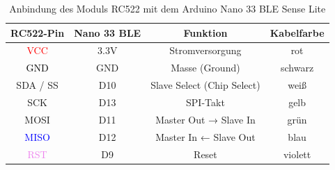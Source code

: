 \begin{table}[H]
	\centering
	\begin{tabular}{|c|c|c|c|}
		\hline
		\textbf{RC522-Pin} & \textbf{Nano 33 BLE} & \textbf{Funktion} & \textbf{Kabelfarbe} \\
		\hline
		\textcolor{red}{VCC} & 3.3V & Stromversorgung & \cellcolor{red!20}rot \\
		\hline
		\textcolor{black}{GND} & GND & Masse (Ground) & \cellcolor{black!10}schwarz \\
		\hline
		\textcolor{white!50!black}{SDA / SS} & D10 & Slave Select (Chip Select) & \cellcolor{gray!10}weiß \\
		\hline
		\textcolor{yellow!70!orange}{SCK} & D13 & SPI-Takt & \cellcolor{yellow!40}gelb \\
		\hline
		\textcolor{green!50!black}{MOSI} & D11 & Master Out → Slave In & \cellcolor{green!20}grün \\
		\hline
		\textcolor{blue}{MISO} & D12 & Master In ← Slave Out & \cellcolor{blue!20}blau \\
		\hline
		\textcolor{violet}{RST} & D9 & Reset & \cellcolor{violet!20}violett \\
		\hline
	\end{tabular}
	\caption{Anbindung des Moduls RC522  mit dem Arduino Nano 33 BLE Sense Lite}
	\label{tab:rc522_arduino}
\end{table}




 

















